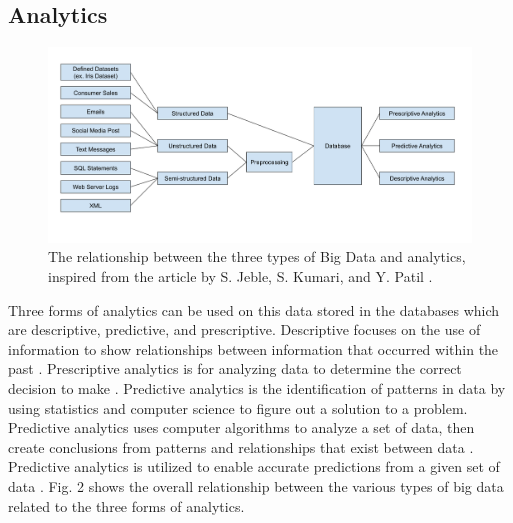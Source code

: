 \documentclass[a4paper, 12pt]{article}
\begin{document}
\subsection{Analytics}

\begin{figure}[ht]
\centering
\includegraphics[scale=0.40]{Analytics}
\caption{The relationship between the three types of Big Data and analytics, inspired from the article by S. Jeble, S. Kumari, and Y. Patil \cite{Jeble2016}.}
\end{figure}

\begin{paragraph}
\indent Three forms of analytics can be used on this data stored in the databases which are descriptive, predictive, and prescriptive. Descriptive focuses on the use of information to show relationships between information that occurred within the past \cite{Jeble2016}. Prescriptive analytics is for analyzing data to determine the correct decision to make \cite{Jeble2016}. Predictive analytics is the identification of patterns in data by using statistics and computer science to figure out a solution to a problem. Predictive analytics uses computer algorithms to analyze a set of data, then create conclusions from patterns and relationships that exist between data \cite{Jeble2016}. Predictive analytics is utilized to enable accurate predictions from a given set of data \cite{Jeble2016}. Fig. 2 shows the overall relationship between the various types of big data related to the three forms of analytics.
\end{paragraph}
\end{document}
